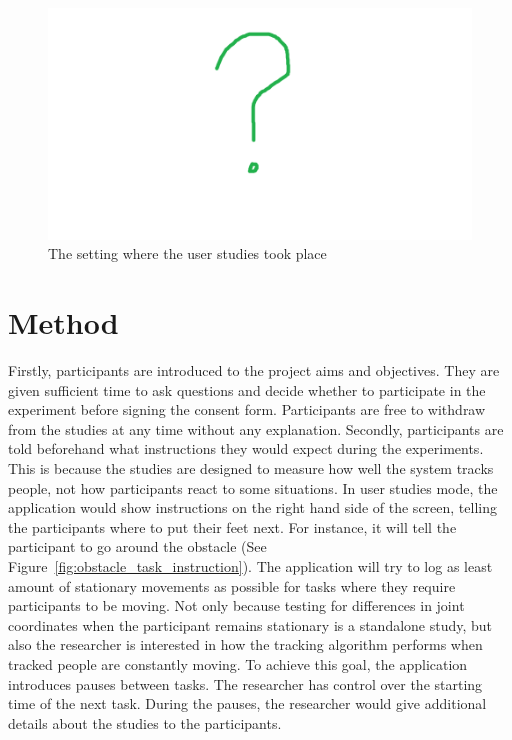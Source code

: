 \begin{figure}[!h]
  \centering

  \includegraphics[width=0.8\linewidth]{figs/missing}
  
  \caption{The setting where the user studies took place}
  
  \label{fig:studies_setting}
\end{figure}

\section{Method}
\label{sec:studies_method}

Firstly, participants are introduced to the project aims and objectives. They are given sufficient time to ask questions and decide whether to participate in the experiment before signing the consent form. Participants are free to withdraw from the studies at any time without any explanation. Secondly, participants are told beforehand what instructions they would expect during the experiments. This is because the studies are designed to measure how well the system tracks people, not how participants react to some situations. In user studies mode, the application would show instructions on the right hand side of the screen, telling the participants where to put their feet next. For instance, it will tell the participant to go around the obstacle (See Figure~\ref{fig:obstacle_task_instruction}). The application will try to log as least amount of stationary movements as possible for tasks where they require participants to be moving. Not only because testing for differences in joint coordinates when the participant remains stationary is a standalone study, but also the researcher is interested in how the tracking algorithm performs when tracked people are constantly moving. To achieve this goal, the application introduces pauses between tasks. The researcher has control over the starting time of the next task. During the pauses, the researcher would give additional details about the studies to the participants.

